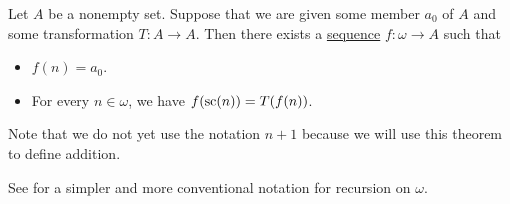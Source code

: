 \begin{theorem}\label{thm:omega_recursion}
  Let \( A \) be a nonempty set. Suppose that we are given some member \( a_0 \) of \( A \) and some transformation \( T: A \to A \). Then there exists a \hyperref[def:sequence]{sequence} \( f: \omega \to A \) such that
  \begin{itemize}
    \item \( f(n) = a_0 \).
    \item For every \( n \in \omega \), we have \( f(\op{sc}(n)) = T(f(n)) \).
  \end{itemize}
\end{theorem}
\begin{comments}
  \item Note that we do not yet use the notation \( n + 1 \) because we will use this theorem to define addition.
  \item See  for a simpler and more conventional notation for recursion on \( \omega \).
\end{comments}

